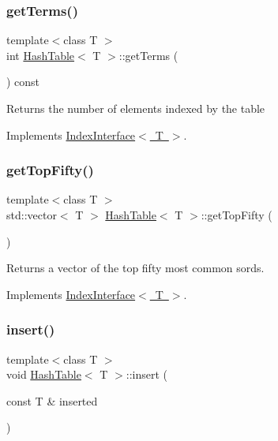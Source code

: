 \subsubsection{\texorpdfstring{get\+Terms()}{getTerms()}}
{\footnotesize\ttfamily template$<$class T $>$ \\
int \mbox{\hyperlink{classHashTable}{Hash\+Table}}$<$ T $>$\+::get\+Terms (\begin{DoxyParamCaption}{ }\end{DoxyParamCaption}) const\hspace{0.3cm}{\ttfamily [virtual]}}

Returns the number of elements indexed by the table 

Implements \mbox{\hyperlink{classIndexInterface}{Index\+Interface$<$ T $>$}}.

\mbox{\label{classHashTable_a6f5359b3b5b29414ef07fcb202b0ed28}} 
\subsubsection{\texorpdfstring{get\+Top\+Fifty()}{getTopFifty()}}
{\footnotesize\ttfamily template$<$class T $>$ \\
std\+::vector$<$ T $>$ \mbox{\hyperlink{classHashTable}{Hash\+Table}}$<$ T $>$\+::get\+Top\+Fifty (\begin{DoxyParamCaption}{ }\end{DoxyParamCaption})\hspace{0.3cm}{\ttfamily [virtual]}}

Returns a vector of the top fifty most common sords. 

Implements \mbox{\hyperlink{classIndexInterface}{Index\+Interface$<$ T $>$}}.

\mbox{\label{classHashTable_a678593aba9238850142914bca5f97158}} 
\subsubsection{\texorpdfstring{insert()}{insert()}}
{\footnotesize\ttfamily template$<$class T $>$ \\
void \mbox{\hyperlink{classHashTable}{Hash\+Table}}$<$ T $>$\+::insert (\begin{DoxyParamCaption}\item[{const T \&}]{inserted }\end{DoxyParamCaption})\hspace{0.3cm}{\ttfamily [virtual]}}

